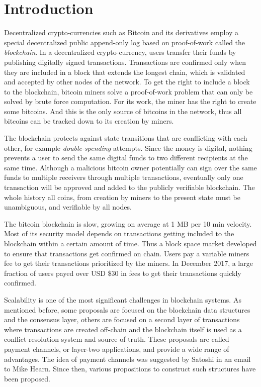 \documentclass{llncs}
\begin{document}
\section{Introduction} Decentralized crypto-currencies such as Bitcoin
\cite{Nakamoto_bitcoin} and its derivatives employ a special decentralized
public append-only log based on proof-of-work called the \textit{blockchain}. In
a decentralized crypto-currency, users transfer their funds by publishing
digitally signed transactions. Transactions are confirmed only when they are
included in a block that extends the longest chain, which is validated and
accepted by other nodes of the network. To get the right to include a block to
the blockchain, bitcoin miners solve a proof-of-work problem that can only be
solved by brute force computation. For its work, the miner has the right to
create some bitcoins. And this is the only source of bitcoins in the
network, thus all bitcoins can be tracked down to its creation by miners.

The blockchain protects against state transitions that are conflicting with each
other, for example \textit{double-spending} attempts. Since the money is
digital, nothing prevents a user to send the same digital funds to two different
recipients at the same time. Although a malicious bitcoin owner potentially can
sign over the same funds to multiple receivers through multiple transactions,
eventually only one transaction will be approved and added to the publicly
verifiable blockchain. The whole history all coins, from creation by miners to
the present state must be unambiguous, and verifiable by all nodes.

The bitcoin blockchain is slow, growing on average at 1 MB per 10 min velocity.
Most of its security model depends on transactions getting included to the
blockchain within a certain amount of time. Thus a block space market developed
to ensure that transactions get confirmed on chain. Users pay a variable miners
fee to get their transactions prioritized by the miners. In December 2017, a
large fraction of users payed over USD \$30 in fees to get their transactions
quickly confirmed.

Scalability is one of the most significant challenges in blockchain systems. As
mentioned before, some proposals are focused on the blockchain data
\cite{SegWit, SegWitBIP, SegWit2x} structures and the consensus layer, others
\cite{lightningNetwork} are focused on a second layer of transactions where
transactions are created off-chain and the blockchain itself is used as a
conflict resolution system and source of truth. These proposals are called
payment channels, or layer-two applications, and provide a wide range of
advantages. The idea of payment channels was suggested by Satoshi in an email
to Mike Hearn. Since then, various propositions to construct such structures
have been proposed.
\end{document}

